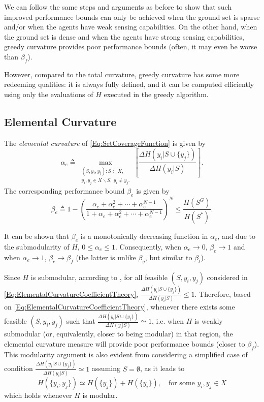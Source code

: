 \documentclass[letterpaper, 10 pt, conference]{ieeeconf}
\begin{document}
We can follow the same steps and arguments as before to show that such improved performance bounds can only be achieved when the ground set is sparse and/or when the agents have weak sensing capabilities. On the other hand, when the ground set is dense and when the agents have strong sensing capabilities, greedy curvature provides poor performance bounds (often, it may even be worse than $\beta_f$). 

However, compared to the total curvature, greedy curvature has some more redeeming qualities: it is always fully defined, and it can be computed efficiently using only the evaluations of $H$ executed in the greedy algorithm.





\subsection{Elemental Curvature \cite{Wang2016}}\label{SubSec:ElementalCurvature}

The \emph{elemental curvature} of \eqref{Eq:SetCoverageFunction} is given by 
\begin{equation}\label{Eq:ElementalCurvatureCoefficientTheory}
    \alpha_e \triangleq \max_{\substack{(S,y_i,y_j): S \subset X,\\ y_i,y_j \in X \backslash S,\ y_i \neq y_j.}}\left[\frac{\Delta H(y_i \vert S \cup \{y_j\})}{\Delta H(y_i \vert S)}\right].
\end{equation}
The corresponding performance bound $\beta_e$ is given by 
\begin{equation}\label{Eq:ElementalCurvatureBoundTheory}
    \beta_e \triangleq 1-\left(\frac{\alpha_e + \alpha_e^2 + \cdots + \alpha_e^{N-1}}{1 + \alpha_e + \alpha_e^2 + \cdots + \alpha_e^{N-1}}\right)^N \leq \frac{H(S^G)}{H(S^*)}.
\end{equation}

It can be shown that $\beta_e$ is a monotonically decreasing function in $\alpha_e$, and due to the submodularity of $H$, $0 \leq \alpha_e \leq 1$. Consequently, when $\alpha_e \rightarrow 0$, $\beta_e \rightarrow 1$ and when $\alpha_e \rightarrow 1$, $\beta_e \rightarrow \beta_f$ (the latter is unlike $\beta_g$, but similar to $\beta_t$).

Since $H$ is submodular, according to  \cite[Prop. 2.1]{Nemhauser1978}, for all feasible $(S,y_i,y_j)$ considered in \eqref{Eq:ElementalCurvatureCoefficientTheory}, $\frac{\Delta H(y_i \vert S \cup \{y_j\})}{\Delta H(y_i \vert S)} \leq 1$. Therefore, based on \eqref{Eq:ElementalCurvatureCoefficientTheory}, whenever there exists some feasible $(S,y_i,y_j)$ such that  $\frac{\Delta H(y_i \vert S \cup \{y_j\})}{\Delta H(y_i \vert S)} \simeq 1$, i.e. when $H$ is weakly submodular (or, equivalently, closer to being modular) in that region, the elemental curvature measure will provide poor performance bounds (closer to $\beta_f$). This modularity argument is also evident from considering a simplified case of condition $\frac{\Delta H(y_i \vert S \cup \{y_j\})}{\Delta H(y_i \vert S)} \simeq 1$ assuming $S=\emptyset$, as it leads to
$$
H(\{y_i,y_j\}) \simeq H(\{y_j\}) + H(\{y_i\}), \quad \mbox{for some } y_i,y_j\in X
$$
which holds whenever $H$ is modular.
\end{document}

